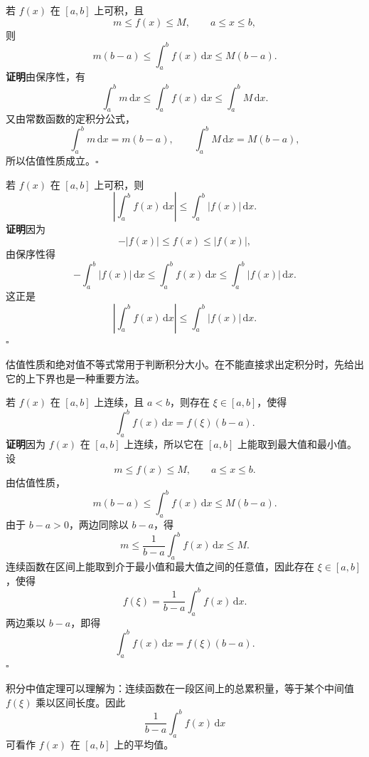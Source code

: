 \documentclass[fontset=fandol]{ctexart}
\newcommand{\dd}{\mathrm{d}}
\begin{document}
\begin{proposition}[估值性质]
若 $f(x)$ 在 $[a,b]$ 上可积，且
\[
m\leq f(x)\leq M,\qquad a\leq x\leq b,
\]
则
\[
m(b-a)\leq \int_a^b f(x)\,\dd x\leq M(b-a).
\]
\textbf{证明}\quad 由保序性，有
\[
\int_a^b m\,\dd x\leq \int_a^b f(x)\,\dd x\leq \int_a^b M\,\dd x.
\]
又由常数函数的定积分公式，
\[
\int_a^b m\,\dd x=m(b-a),\qquad \int_a^b M\,\dd x=M(b-a),
\]
所以估值性质成立。\hfill$\square$
\end{proposition}

\begin{proposition}[绝对值不等式]
若 $f(x)$ 在 $[a,b]$ 上可积，则
\[
\left|\int_a^b f(x)\,\dd x\right|\leq \int_a^b |f(x)|\,\dd x.
\]
\textbf{证明}\quad 因为
\[
-|f(x)|\leq f(x)\leq |f(x)|,
\]
由保序性得
\[
-\int_a^b |f(x)|\,\dd x\leq \int_a^b f(x)\,\dd x\leq \int_a^b |f(x)|\,\dd x.
\]
这正是
\[
\left|\int_a^b f(x)\,\dd x\right|\leq \int_a^b |f(x)|\,\dd x.
\]
\noindent\hfill$\square$
\end{proposition}

估值性质和绝对值不等式常用于判断积分大小。在不能直接求出定积分时，先给出它的上下界也是一种重要方法。

\begin{theorem}[积分中值定理]
若 $f(x)$ 在 $[a,b]$ 上连续，且 $a<b$，则存在 $\xi\in[a,b]$，使得
\[
\int_a^b f(x)\,\dd x=f(\xi)(b-a).
\]
\textbf{证明}\quad 因为 $f(x)$ 在 $[a,b]$ 上连续，所以它在 $[a,b]$ 上能取到最大值和最小值。设
\[
m\leq f(x)\leq M,\qquad a\leq x\leq b.
\]
由估值性质，
\[
m(b-a)\leq \int_a^b f(x)\,\dd x\leq M(b-a).
\]
由于 $b-a>0$，两边同除以 $b-a$，得
\[
m\leq \frac1{b-a}\int_a^b f(x)\,\dd x\leq M.
\]
连续函数在区间上能取到介于最小值和最大值之间的任意值，因此存在 $\xi\in[a,b]$，使得
\[
f(\xi)=\frac1{b-a}\int_a^b f(x)\,\dd x.
\]
两边乘以 $b-a$，即得
\[
\int_a^b f(x)\,\dd x=f(\xi)(b-a).
\]
\noindent\hfill$\square$
\end{theorem}

积分中值定理可以理解为：连续函数在一段区间上的总累积量，等于某个中间值 $f(\xi)$ 乘以区间长度。因此
\[
\frac1{b-a}\int_a^b f(x)\,\dd x
\]
可看作 $f(x)$ 在 $[a,b]$ 上的平均值。
\end{document}
